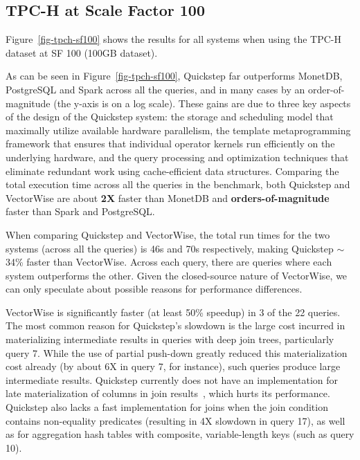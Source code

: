 \subsection{TPC-H at Scale Factor 100} \label{exp-tpch-sf-100}

Figure~\ref{fig-tpch-sf100} shows the results for all systems when using the TPC-H dataset at SF 100 (\texttildelow 100GB dataset).

As can be seen in Figure~\ref{fig-tpch-sf100}, Quickstep far outperforms MonetDB, PostgreSQL and Spark across all the queries, and in many cases by an order-of-magnitude (the y-axis is on a log scale). These gains are due to three key aspects of the design of the Quickstep system: the storage and scheduling model that maximally utilize available hardware parallelism, the template metaprogramming framework that ensures that individual operator kernels run efficiently on the underlying hardware, and the query processing and optimization techniques that eliminate redundant work using cache-efficient data structures. Comparing the total execution time across all the queries in the benchmark, both Quickstep and VectorWise are about \textbf{2X} faster than MonetDB and \textbf{orders-of-magnitude} faster than Spark and PostgreSQL.

When comparing Quickstep and VectorWise, the total run times for the two systems (across all the queries) is 46s and 70s respectively, making Quickstep $\sim$34\% faster than VectorWise. Across each query, there are queries where each system outperforms the other. Given the closed-source nature of VectorWise, we can only speculate about possible reasons for performance differences.

VectorWise is significantly faster (at least 50\% speedup) in 3 of the 22 queries. The most common reason for Quickstep's slowdown is the large cost incurred in materializing intermediate results in queries with deep join trees, particularly query 7. While the use of partial push-down greatly reduced this materialization cost already (by about 6X in query 7, for instance), such queries produce large intermediate results. Quickstep currently does not have an implementation for late materialization of columns in join results~\cite{Shrinivas2013Materialization}, which hurts its performance. Quickstep also lacks a fast implementation for joins when the join condition contains non-equality predicates (resulting in 4X slowdown in query 17), as well as for aggregation hash tables with composite, variable-length keys (such as query 10).

